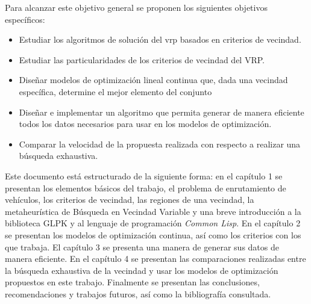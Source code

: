 \documentclass[12pt]{article}
\begin{document}
Para alcanzar este objetivo general se proponen los siguientes objetivos específicos:
\begin{itemize}
\item
Estudiar los algoritmos de solución del vrp basados en criterios de vecindad.
\item
Estudiar las particularidades de los criterios de vecindad del VRP.

\item 
Diseñar modelos de optimización lineal continua que, dada una vecindad específica, determine el mejor elemento del conjunto

\item 
Diseñar e implementar un algoritmo que permita generar de manera eficiente todos los datos necesarios para usar en los modelos de optimización.

\item Comparar la velocidad de la propuesta realizada con respecto a realizar una búsqueda exhaustiva.
\end{itemize}



Este documento está estructurado de la siguiente forma: en el capítulo 1 se presentan los elementos básicos del trabajo, el problema de enrutamiento de vehículos, los criterios de vecindad, las regiones de una vecindad, la metaheurística de Búsqueda en Vecindad Variable y una breve introducción a la biblioteca GLPK y al lenguaje de programación \textit{Common Lisp}. En el capítulo 2 se presentan los modelos de optimización continua, así como los criterios con los que trabaja. El capítulo 3 se presenta una manera de generar sus datos de manera eficiente. En el capítulo 4 se presentan las comparaciones realizadas entre la búsqueda exhaustiva de la vecindad y usar los modelos de optimización propuestos en este trabajo. Finalmente se presentan las conclusiones, recomendaciones y trabajos futuros, así como la bibliografía consultada.
\newpage

 
\end{document}
